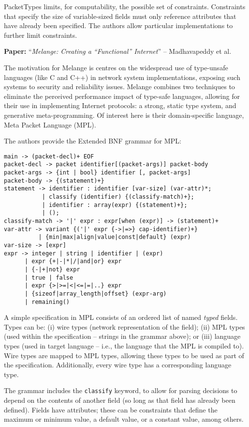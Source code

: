 \documentclass[10pt]{article}
\newcommand{\paper}[3]{\vspace{4mm}\noindent\textbf{Paper:} ``\textit{#1}'' -- #2 \cite{#3}\vspace{3mm}}
\begin{document}
PacketTypes limits, for computability, the possible set of constraints. Constraints that
specify the size of variable-sized fields must only reference attributes that have already
been specified. The authors allow particular implementations to further limit
constraints.

\paper{Melange: Creating a ``Functional'' Internet}{Madhavapeddy et al.}{madhavapeddy2007melange}

The motivation for Melange is centres on the widespread use of type-unsafe languages (like
C and C++) in network system implementations, exposing such systems to security and
reliability issues. Melange combines two techniques to eliminate the perceived performance
impact of type-safe languages, allowing for their use in implementing Internet protocols:
a strong, static type system, and generative meta-programming. Of interest here is their
domain-specific language, Meta Packet Language (MPL).

The authors provide the Extended BNF grammar for MPL:

\begin{verbatim}
main -> (packet-decl)+ EOF
packet-decl -> packet identifier[(packet-args)] packet-body
packet-args -> {int | bool} identifier [, packet-args]
packet-body -> {(statement)+}
statement -> identifier : identifier [var-size] (var-attr)*;
           | classify (identifier) {(classify-match)+};
           | identifier : array(expr) {(statement)+};
           | ();
classify-match -> '|' expr : expr[when (expr)] -> (statement)+
var-attr -> variant {('|' expr {->|=>} cap-identifier)+}
          | {min|max|align|value|const|default} (expr)
var-size -> [expr]
expr -> integer | string | identifier | (expr)
      | expr {+|-|*|/|and|or} expr
      | {-|+|not} expr
      | true | false
      | expr {>|>=|<|<=|=|..} expr
      | {sizeof|array_length|offset} (expr-arg)
      | remaining()
\end{verbatim}

A simple specification in MPL consists of an ordered list of named \emph{typed} fields.
Types can be: (i) wire types (network representation of the field); (ii) MPL types (used
within the specification -- strings in the grammar above); or (iii) language types (used
in target language -- i.e., the language that the MPL is compiled to). Wire types are
mapped to MPL types, allowing these types to be used as part of the specification.
Additionally, every wire type has a corresponding language type. 

The grammar includes the \texttt{classify} keyword, to allow for parsing decisions to
depend on the contents of another field (so long as that field has already been defined).
Fields have attributes; these can be constraints that define the maximum or minimum value,
a default value, or a constant value, among others. 
\end{document}
